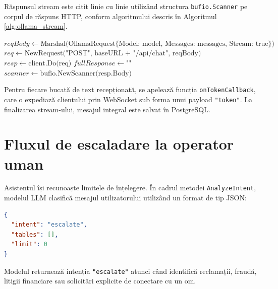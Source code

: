 Răspunsul stream este citit linie cu linie utilizând structura \texttt{bufio.Scanner} pe corpul de răspuns HTTP, conform algoritmului descris în Algoritmul \ref{alg:ollama_stream}.

\begin{algorithm}[htbp]
\DontPrintSemicolon
\SetAlgoLined
{}
\BlankLine
$reqBody \leftarrow \text{Marshal(OllamaRequest\{Model: model, Messages: messages, Stream: true\})}$\;
$req \leftarrow \text{NewRequest("POST", baseURL + "/api/chat", reqBody)}$\;
$resp \leftarrow \text{client.Do(req)}$\;
\;
$fullResponse \leftarrow \text{""}$\;
$scanner \leftarrow \text{bufio.NewScanner(resp.Body)}$\;
\;
\caption{Algoritmul de streaming token-by-token de la Ollama API în Go}
\label{alg:ollama_stream}
\end{algorithm}

Pentru fiecare bucată de text recepționată, se apelează funcția \texttt{onTokenCallback}, care o expediază clientului prin WebSocket sub forma unui payload \texttt{"token"}. La finalizarea stream-ului, mesajul integral este salvat în PostgreSQL.

\section{Fluxul de escaladare la operator uman}

Asistentul își recunoaște limitele de înțelegere. În cadrul metodei \texttt{AnalyzeIntent}, modelul LLM clasifică mesajul utilizatorului utilizând un format de tip JSON:
\begin{lstlisting}[language=JSON]
{
  "intent": "escalate",
  "tables": [],
  "limit": 0
}
\end{lstlisting}
Modelul returnează intenția \texttt{"escalate"} atunci când identifică reclamații, fraudă, litigii financiare sau solicitări explicite de conectare cu un om.

